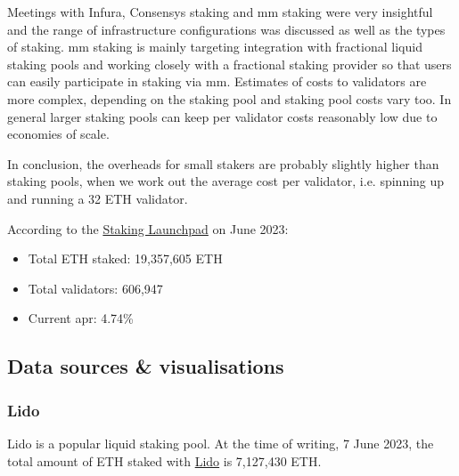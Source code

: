 \documentclass{article}
\begin{document}
Meetings with Infura, Consensys staking and  \gls{mm} staking were very
insightful and the range of infrastructure configurations was discussed as well
as the types of staking. \gls{mm} staking is mainly targeting integration with
fractional liquid staking pools and working closely with a fractional staking
provider so that users can easily participate in staking via \gls{mm}.
Estimates of costs to validators are more complex, depending on the staking
pool and staking pool costs vary too. In general larger staking pools can keep
per validator costs reasonably low due to economies of scale.

In conclusion, the overheads for small stakers are probably slightly higher
than staking pools, when we work out the average cost per validator, i.e.
spinning up and running a 32 ETH validator. 

According to the \href{https://launchpad.ethereum.org/en/}{Staking Launchpad}
on June 2023:
\begin{itemize}
  \item Total ETH staked: 19,357,605 ETH
  \item Total validators: 606,947
  \item Current \gls{apr}: 4.74\%
\end{itemize}

\subsection{Data sources \& visualisations}
\label{sec:datastaking}

\subsubsection*{Lido}
Lido is a popular liquid staking pool. 
At the time of writing, 7 June 2023, the total amount of ETH staked with
\href{https://lido.fi/ethereum}{Lido}  is 7,127,430 ETH. 
\end{document}
